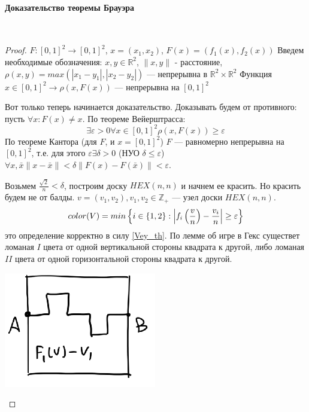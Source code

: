 \documentclass{article}
\let\vanillaparagraph\paragraph
\renewcommand{\paragraph}[1]{\vanillaparagraph{#1}\mbox{}\\}
\begin{document}
\paragraph{Доказательство теоремы Брауэра}
\begin{proof}
$F:[0, 1]^2 \rightarrow [0, 1]^2$, $x = (x_1, x_2)$, $F(x) = \left(f_1(x), f_2(x)\right)$
Введем необходимые обозначения:
$x, y \in \mathbb{R}^2$, $\| x, y\|$ - расстояние, $\rho(x, y) = max(|x_1 - y_1|, |x_2 - y_2|)$ --- непрерывна в $\mathbb{R}^2 \times \mathbb{R}^2$
Функция $x \in [0, 1]^2 \rightarrow \rho\left(x, F(x)\right)$ --- непрерывна на $[0, 1]^2$

Вот только теперь начинается доказательство. Доказывать будем от противного: пусть $\forall x: F(x) \neq x$.
По теореме Вейерштрасса:
\begin{equation}\label{Vey_th}
\exists \varepsilon > 0 \forall x \in [0, 1]^2 \rho\left(x, F(x)\right) \geq \varepsilon
\end{equation}
По теореме Кантора (для $F$, и $x = [0, 1]^2$) $F$ --- равномерно непрерывна на $[0, 1]^2$, т.е. для этого $\varepsilon \exists \delta > 0$ (НУО $\delta \leq \varepsilon$) $\forall x, \bar{x} \|x - \bar{x} \| < \delta \|F(x) - F(\bar{x})\| < \varepsilon$.

Возьмем $\frac{\sqrt{2}}{n} < \delta$, построим доску $HEX(n, n)$ и начнем ее красить. Но красить будем не от балды. $v = (v_1, v_2), v_1, v_2 \in \mathbb{Z}_+$ --- узел доски $HEX(n, n)$. 
\begin{equation}
color(V) = min\left\{i\in\{1, 2\}: \left| f_i\left(\frac{v} {n}\right) - \frac{v_i} {n}\right| \geq \varepsilon\right\}\notag
\end{equation}
это определение корректно в силу \eqref{Vey_th}.
По лемме об игре в Гекс существет ломаная $I$ цвета от одной вертикальной стороны квадрата к другой, либо ломаная $II$ цвета от одной горизонтальной стороны квадрата к другой.

\begin{center}
    \includegraphics[scale=0.44]{../images/Brauer's_th3.png}
\end{center}


\end{proof}
\end{document}
